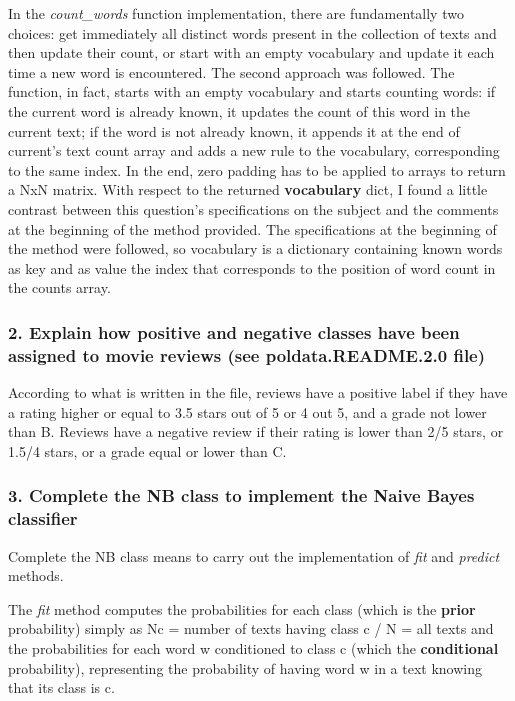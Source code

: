\documentclass[11pt]{article}
\begin{document}
In the \emph{count\_words} function implementation, there are
fundamentally two choices: get immediately all distinct words present in
the collection of texts and then update their count, or start with an
empty vocabulary and update it each time a new word is encountered. The
second approach was followed. The function, in fact, starts with an
empty vocabulary and starts counting words: if the current word is
already known, it updates the count of this word in the current text; if
the word is not already known, it appends it at the end of current's
text count array and adds a new rule to the vocabulary, corresponding to
the same index. In the end, zero padding has to be applied to arrays to
return a NxN matrix. With respect to the returned \textbf{vocabulary}
dict, I found a little contrast between this question's specifications
on the subject and the comments at the beginning of the method provided.
The specifications at the beginning of the method were followed, so
vocabulary is a dictionary containing known words as key and as value
the index that corresponds to the position of word count in the counts
array.

    \subsubsection{2. Explain how positive and negative classes have been
assigned to movie reviews (see poldata.README.2.0
file)}\label{explain-how-positive-and-negative-classes-have-been-assigned-to-movie-reviews-see-poldata.readme.2.0-file}

According to what is written in the file, reviews have a positive label
if they have a rating higher or equal to 3.5 stars out of 5 or 4 out 5,
and a grade not lower than B. Reviews have a negative review if their
rating is lower than 2/5 stars, or 1.5/4 stars, or a grade equal or
lower than C.

\subsubsection{3. Complete the NB class to implement the Naive Bayes
classifier}\label{complete-the-nb-class-to-implement-the-naive-bayes-classifier}

Complete the NB class means to carry out the implementation of
\emph{fit} and \emph{predict} methods.

The \emph{fit} method computes the probabilities for each class (which
is the \textbf{prior} probability) simply as Nc = number of texts having
class c / N = all texts and the probabilities for each word w
conditioned to class c (which the \textbf{conditional} probability),
representing the probability of having word w in a text knowing that its
class is c.
\end{document}
